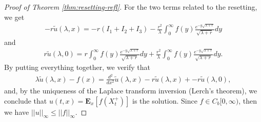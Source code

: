 \documentclass[11pt,a4paper]{article}
\theoremstyle{definition}
\theoremstyle{remark}
\begin{document}
\begin{proof}[Proof of Theorem \ref{thm:resetting-refl}]
		For the two terms related to the resetting, we get
		\begin{align*}
			- r \widetilde{u}(\lambda, x) = - r( I_1+I_2+I_3) - \frac{r^2}{\lambda} \int_{0}^\infty f(y) \frac{e^{-y \sqrt{\lambda + r}}}{\sqrt{\lambda + r}} dy
		\end{align*}
		and
		\begin{align*}
			r \widetilde{u}(\lambda, 0) %
			= r \int_{0}^\infty f(y) \frac{e^{-y \sqrt{\lambda + r}}}{\sqrt{\lambda + r}} dy + \frac{r^2}{\lambda} \int_{0}^\infty f(y) \frac{e^{-y \sqrt{\lambda + r}}}{\sqrt{\lambda + r}} dy.
		\end{align*}
		By putting everything together, we verify that
		\begin{align*}
			\lambda  \widetilde{u}(\lambda, x) - f(x) = \frac{d^2}{dx^2} \widetilde{u}(\lambda, x) - r \widetilde{u}(\lambda, x) + - r \widetilde{u}(\lambda, 0),
		\end{align*}
		and, by the uniqueness of the Laplace transform inversion (Lerch's theorem), we conclude that \( u(t,x)=\mathbf{E}_x[f (X_t^+)] \) is the solution. %
		Since \(f \in C_b[0,\infty)\), then we have \( \vert \vert u \vert \vert_\infty \leq \vert \vert f \vert \vert_\infty\).
	\end{proof}
\end{document}
